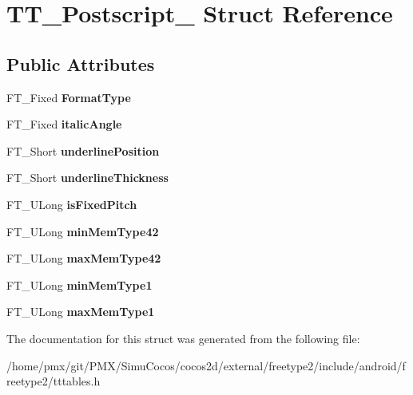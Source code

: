 \hypertarget{structTT__Postscript__}{}\section{T\+T\+\_\+\+Postscript\+\_\+ Struct Reference}
\label{structTT__Postscript__}
\subsection*{Public Attributes}
\begin{DoxyCompactItemize}
\item 
\mbox{\label{structTT__Postscript___a5ed6585c01fa4ffc3f8537d58bdd955f}} 
F\+T\+\_\+\+Fixed {\bfseries Format\+Type}
\item 
\mbox{\label{structTT__Postscript___adcca36c7fbcbdff00fc8c2884a215830}} 
F\+T\+\_\+\+Fixed {\bfseries italic\+Angle}
\item 
\mbox{\label{structTT__Postscript___a909fd5064ab7547bb8ed984b5dfe2fe2}} 
F\+T\+\_\+\+Short {\bfseries underline\+Position}
\item 
\mbox{\label{structTT__Postscript___a4e4654766a4f27054c9a35958515e186}} 
F\+T\+\_\+\+Short {\bfseries underline\+Thickness}
\item 
\mbox{\label{structTT__Postscript___ab9a537994be4f81cb35f61f83cd97949}} 
F\+T\+\_\+\+U\+Long {\bfseries is\+Fixed\+Pitch}
\item 
\mbox{\label{structTT__Postscript___ad78af4931654c197d4a8d0f04d473885}} 
F\+T\+\_\+\+U\+Long {\bfseries min\+Mem\+Type42}
\item 
\mbox{\label{structTT__Postscript___a70c4ba372d04e686208f0fede9885314}} 
F\+T\+\_\+\+U\+Long {\bfseries max\+Mem\+Type42}
\item 
\mbox{\label{structTT__Postscript___a91a8b40f60e67a1920209e6b08355848}} 
F\+T\+\_\+\+U\+Long {\bfseries min\+Mem\+Type1}
\item 
\mbox{\label{structTT__Postscript___a944a3df5127262db0f7ae92868defb99}} 
F\+T\+\_\+\+U\+Long {\bfseries max\+Mem\+Type1}
\end{DoxyCompactItemize}


The documentation for this struct was generated from the following file\+:\begin{DoxyCompactItemize}
\item 
/home/pmx/git/\+P\+M\+X/\+Simu\+Cocos/cocos2d/external/freetype2/include/android/freetype2/tttables.\+h\end{DoxyCompactItemize}
